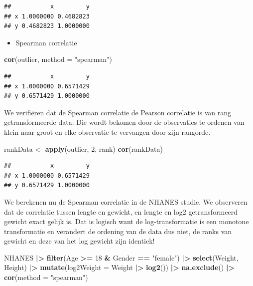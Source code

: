\documentclass[
  12pt,dutch]{book}
\newenvironment{Shaded}{\begin{snugshade}}{\end{snugshade}}
\newcommand{\AttributeTok}[1]{\textcolor[rgb]{0.13,0.29,0.53}{#1}}
\newcommand{\DecValTok}[1]{\textcolor[rgb]{0.00,0.00,0.81}{#1}}
\newcommand{\FunctionTok}[1]{\textcolor[rgb]{0.13,0.29,0.53}{\textbf{#1}}}
\newcommand{\NormalTok}[1]{#1}
\newcommand{\OtherTok}[1]{\textcolor[rgb]{0.56,0.35,0.01}{#1}}
\newcommand{\SpecialCharTok}[1]{\textcolor[rgb]{0.81,0.36,0.00}{\textbf{#1}}}
\newcommand{\StringTok}[1]{\textcolor[rgb]{0.31,0.60,0.02}{#1}}
\providecommand{\tightlist}{%
  \setlength{\itemsep}{0pt}\setlength{\parskip}{0pt}}
\theoremstyle{definition}
\theoremstyle{definition}
\theoremstyle{definition}
\theoremstyle{definition}
\theoremstyle{remark}
\begin{document}
\begin{verbatim}
##           x         y
## x 1.0000000 0.4682823
## y 0.4682823 1.0000000
\end{verbatim}

\begin{itemize}
\tightlist
\item
  Spearman correlatie
\end{itemize}

\begin{Shaded}
\begin{Highlighting}[]
\FunctionTok{cor}\NormalTok{(outlier, }\AttributeTok{method =} \StringTok{"spearman"}\NormalTok{)}
\end{Highlighting}
\end{Shaded}

\begin{verbatim}
##           x         y
## x 1.0000000 0.6571429
## y 0.6571429 1.0000000
\end{verbatim}

We verifiëren dat de Spearman correlatie de Pearson correlatie is van rang getransformeerde data. Die wordt bekomen door de observaties te ordenen van klein naar groot en elke observatie te vervangen door zijn rangorde.

\begin{Shaded}
\begin{Highlighting}[]
\NormalTok{rankData }\OtherTok{\textless{}{-}} \FunctionTok{apply}\NormalTok{(outlier, }\DecValTok{2}\NormalTok{, rank)}
\FunctionTok{cor}\NormalTok{(rankData)}
\end{Highlighting}
\end{Shaded}

\begin{verbatim}
##           x         y
## x 1.0000000 0.6571429
## y 0.6571429 1.0000000
\end{verbatim}

We berekenen nu de Spearman correlatie in de NHANES studie.
We observeren dat de correlatie tussen lengte en gewicht, en lengte en log2 getransformeerd gewicht exact gelijk is.
Dat is logisch want de log-transformatie is een monotone transformatie en verandert de ordening van de data dus niet, de ranks van gewicht en deze van het log gewicht zijn identiek!

\begin{Shaded}
\begin{Highlighting}[]
\NormalTok{NHANES }\SpecialCharTok{|\textgreater{}}
    \FunctionTok{filter}\NormalTok{(Age }\SpecialCharTok{\textgreater{}=} \DecValTok{18} \SpecialCharTok{\&}\NormalTok{ Gender }\SpecialCharTok{==} \StringTok{"female"}\NormalTok{) }\SpecialCharTok{|\textgreater{}}
    \FunctionTok{select}\NormalTok{(Weight, Height) }\SpecialCharTok{|\textgreater{}}
    \FunctionTok{mutate}\NormalTok{(}\AttributeTok{log2Weight =}\NormalTok{ Weight }\SpecialCharTok{|\textgreater{}}
        \FunctionTok{log2}\NormalTok{()) }\SpecialCharTok{|\textgreater{}}
    \FunctionTok{na.exclude}\NormalTok{() }\SpecialCharTok{|\textgreater{}}
    \FunctionTok{cor}\NormalTok{(}\AttributeTok{method =} \StringTok{"spearman"}\NormalTok{)}
\end{Highlighting}
\end{Shaded}
\end{document}

